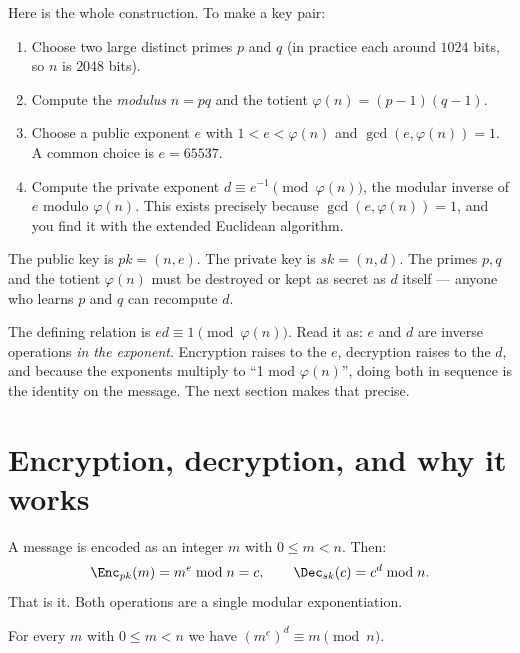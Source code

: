 Here is the whole construction. To make a key pair:

\begin{enumerate}
  \item Choose two large distinct primes $p$ and $q$ (in practice each around $1024$ bits, so $n$ is $2048$ bits).
  \item Compute the \emph{modulus} $n = pq$ and the totient $\varphi(n) = (p-1)(q-1)$.
  \item Choose a public exponent $e$ with $1 < e < \varphi(n)$ and $\gcd(e,\varphi(n))=1$. A common choice is $e = 65537$.
  \item Compute the private exponent $d \equiv e^{-1} \pmod{\varphi(n)}$, the modular inverse of $e$ modulo $\varphi(n)$. This exists precisely because $\gcd(e,\varphi(n))=1$, and you find it with the extended Euclidean algorithm.
\end{enumerate}

The public key is $pk = (n, e)$. The private key is $sk = (n, d)$. The primes $p,q$ and the totient $\varphi(n)$ must be destroyed or kept as secret as $d$ itself --- anyone who learns $p$ and $q$ can recompute $d$.

\begin{focusbox}
The defining relation is $ed \equiv 1 \pmod{\varphi(n)}$. Read it as: $e$ and $d$ are inverse operations \emph{in the exponent}. Encryption raises to the $e$, decryption raises to the $d$, and because the exponents multiply to ``1 mod $\varphi(n)$'', doing both in sequence is the identity on the message. The next section makes that precise.
\end{focusbox}

\section{Encryption, decryption, and why it works}
\label{ch19:encdec}

A message is encoded as an integer $m$ with $0 \le m < n$. Then:
\[
  \Enc_{pk}(m) = m^{e} \bmod n = c, \qquad
  \Dec_{sk}(c) = c^{d} \bmod n.
\]
That is it. Both operations are a single modular exponentiation.

\begin{theorem}
\label{ch19:correctness}
For every $m$ with $0\le m < n$ we have $(m^e)^d \equiv m \pmod n$.
\end{theorem}

